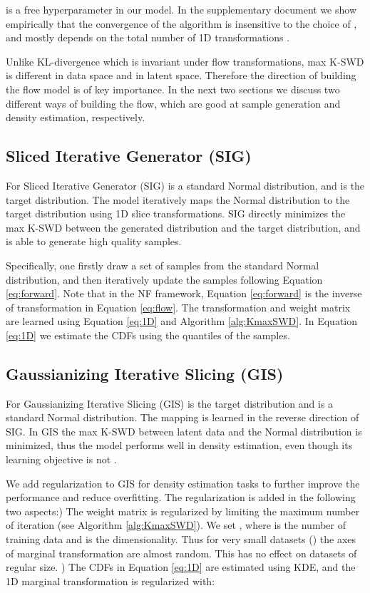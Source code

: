 \documentclass{article}
\begin{document}
 is a free hyperparameter in our model. In the supplementary document we show empirically that the convergence of the algorithm is insensitive to the choice of , and mostly depends on the total number of 1D transformations .

Unlike KL-divergence which is invariant under flow transformations, max K-SWD is different in data space and in latent space. Therefore the direction of building the flow model is of key importance. In the next two sections we discuss two different ways of building the flow, which are good at sample generation and density estimation, respectively.

\subsection{Sliced Iterative Generator (SIG)}

\label{subsec:SIG}

For Sliced Iterative Generator (SIG)  is a standard Normal distribution, and  is the target distribution. The model iteratively maps the Normal distribution to the target distribution using 1D slice transformations. 
SIG directly minimizes the max K-SWD between the generated distribution and the target distribution, and is able to generate high quality samples.

Specifically, one firstly draw a set of samples from the standard Normal distribution, and then iteratively update the samples following Equation \ref{eq:forward}. Note that in the NF framework, Equation \ref{eq:forward} is the inverse of transformation  in Equation \ref{eq:flow}. The  transformation and weight matrix  are learned using Equation \ref{eq:1D} and Algorithm \ref{alg:KmaxSWD}. In Equation \ref{eq:1D} we estimate the CDFs using the quantiles of the samples.

\subsection{Gaussianizing Iterative Slicing (GIS)}

\label{subsec:GIS}

For Gaussianizing Iterative Slicing (GIS)
 is the target distribution and  is a standard Normal distribution. The mapping is learned in the reverse direction of SIG. 
In GIS the max K-SWD between latent data and the Normal distribution is minimized, thus the model performs well in density estimation, even though its learning objective is not .

We add regularization to GIS for density estimation tasks to further improve the performance and reduce overfitting. The regularization is added in the following two aspects:) The weight matrix  is regularized by limiting the maximum number of iteration  (see Algorithm \ref{alg:KmaxSWD}). We set , where  is the number of training data and  is the dimensionality. Thus for very small datasets () the axes of marginal transformation are almost random. This has no effect on datasets of regular size. ) The CDFs in Equation \ref{eq:1D} are estimated using KDE, and the 1D marginal transformation is regularized with:
\end{document}
